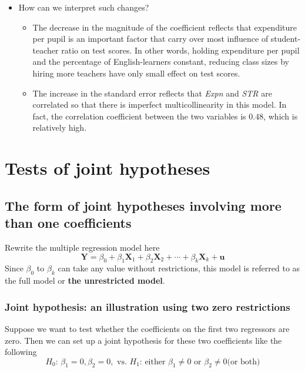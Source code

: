 \documentclass[a4paper,11pt]{article}
\begin{document}
\begin{itemize}
\item How can we interpret such changes?
\label{sec:org466110a}

\begin{itemize}
\item The decrease in the magnitude of the coefficient reflects that
expenditure per pupil is an important factor that carry over most
influence of student-teacher ratio on test scores. In other words,
holding expenditure per pupil and the percentage of English-learners
constant, reducing class sizes by hiring more teachers have only
small effect on test scores.

\item The increase in the standard error reflects that \emph{Expn} and \emph{STR}
are correlated so that there is imperfect multicollinearity in this
model. In fact, the correlation coefficient between the two
variables is 0.48, which is relatively high.
\end{itemize}
\end{itemize}


\section{Tests of joint hypotheses}
\label{sec:org9502f1b}

\subsection{The form of joint hypotheses involving more than one coefficients}
\label{sec:org4928392}

Rewrite the multiple regression model here
\begin{equation}
\label{eq:fullmodel}
\mathbf{Y} = \beta_0 + \beta_1 \mathbf{X}_1 + \beta_2 \mathbf{X}_2 + \cdots + \beta_k \mathbf{X}_k + \mathbf{u}
\end{equation}
Since \(\beta_0\) to \(\beta_k\) can take any value without restrictions,
this model is referred to as the full model or \textbf{the unrestricted
model}.

\subsubsection*{Joint hypothesis: an illustration using two zero restrictions}
\label{sec:orgd2e783a}

Suppose we want to test whether the coefficients on the first two
regressors are zero. Then we can set up a joint hypothesis for these two
coefficients like the following
 \[ H_0:\, \beta_1 = 0, \beta_2 = 0, \text{ vs. }
H_1:\, \text{either } \beta_1 \neq 0 \text{ or } \beta_2 \neq 0 \text{
(or both)} \]
\end{document}
